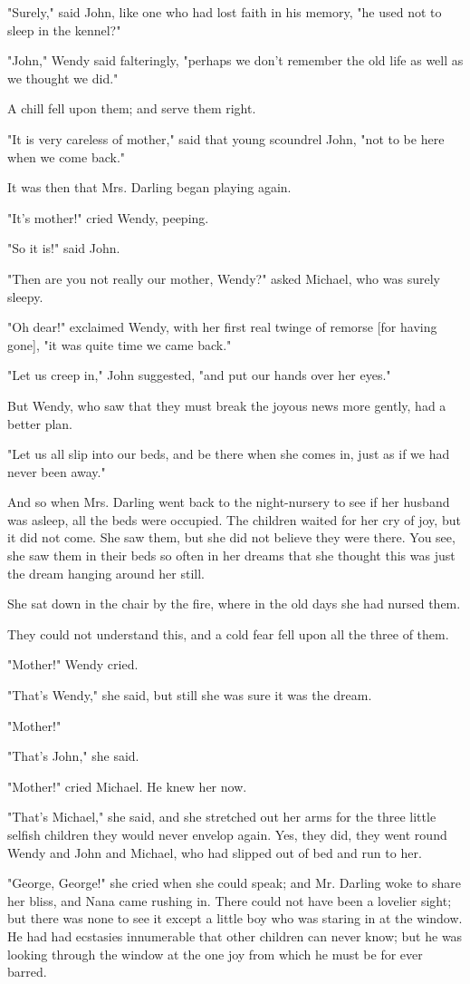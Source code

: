 "Surely," said John, like one who had lost faith in his memory, "he used
not to sleep in the kennel?"


"John," Wendy said falteringly, "perhaps we don't remember the old life as
well as we thought we did."


A chill fell upon them; and serve them right.


"It is very careless of mother," said that young scoundrel John, "not to
be here when we come back."


It was then that Mrs. Darling began playing again.


"It's mother!" cried Wendy, peeping.


"So it is!" said John.


"Then are you not really our mother, Wendy?" asked Michael, who was surely
sleepy.


"Oh dear!" exclaimed Wendy, with her first real twinge of remorse [for
having gone], "it was quite time we came back."


"Let us creep in," John suggested, "and put our hands over her eyes."


But Wendy, who saw that they must break the joyous news more gently, had a
better plan.


"Let us all slip into our beds, and be there when she comes in, just as if
we had never been away."


And so when Mrs. Darling went back to the night-nursery to see if her
husband was asleep, all the beds were occupied. The children waited for
her cry of joy, but it did not come. She saw them, but she did not believe
they were there. You see, she saw them in their beds so often in her
dreams that she thought this was just the dream hanging around her still.


She sat down in the chair by the fire, where in the old days she had
nursed them.


They could not understand this, and a cold fear fell upon all the three of
them.


"Mother!" Wendy cried.


"That's Wendy," she said, but still she was sure it was the dream.


"Mother!"


"That's John," she said.


"Mother!" cried Michael. He knew her now.


"That's Michael," she said, and she stretched out her arms for the three
little selfish children they would never envelop again. Yes, they did,
they went round Wendy and John and Michael, who had slipped out of bed and
run to her.


"George, George!" she cried when she could speak; and Mr. Darling woke to
share her bliss, and Nana came rushing in. There could not have been a
lovelier sight; but there was none to see it except a little boy who was
staring in at the window. He had had ecstasies innumerable that other
children can never know; but he was looking through the window at the one
joy from which he must be for ever barred.

